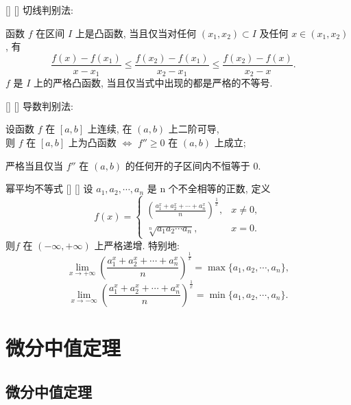 \documentclass[UTF8]{ctexart}
\begin{document}
			\begin{thm}
			    []
			    {}
			    []
			    []
				切线判别法: 

				函数  \( f \)  在区间  \( I \)  上是凸函数, 当且仅当对任何  \( (x_1, x_2) \subset I \)  及任何  \( x \in (x_1, x_2) \) , 有
				\[\frac{f(x) - f(x_1)}{x - x_1} \leq \frac{f(x_2) - f(x_1)}{x_2 - x_1} \leq \frac{f(x_2) - f(x)}{x_2 - x}. \quad\] 
				\( f \)  是  \( I \)  上的严格凸函数, 当且仅当式中出现的都是严格的不等号. 
			\end{thm}

			\begin{thm}
			    []
			    {}
			    []
			    []
			导数判别法: 

			设函数  \( f \)  在  \([a, b]\)  上连续, 在  \((a, b)\)  上二阶可导, \\
			则  \( f \)  在  \([a, b]\)  上为凸函数 \(\Longleftrightarrow\) \( f'' \geq 0 \)  在  \((a, b)\)  上成立; 

			严格当且仅当  \( f'' \) 在  \((a, b)\)  的任何开的子区间内不恒等于 0. 
			\end{thm}

			\begin{xmp}
			    []
			    {幂平均不等式}
			    []
			    []
				 设 \(a_1, a_2, \cdots, a_n\) 是 n 个不全相等的正数, 定义
                \[f(x) = 
                \begin{cases}
                \left( \frac{a_1^x + a_2^x + \cdots + a_n^x}{n} \right)^{\frac{1}{x}}, & x \neq 0, \\
                \sqrt[n]{a_1 a_2 \cdots a_n}, & x = 0.
                \end{cases}
                \]
                则\(f\) 在 \((-\infty, +\infty)\) 上严格递增.
                特别地: 
                \[
                \lim_{x \to +\infty} \left( \frac{a_1^x + a_2^x + \cdots + a_n^x}{n} \right)^{\frac{1}{x}} = \max\{a_1, a_2, \cdots, a_n\},
                \]
                \[
                \lim_{x \to -\infty} \left( \frac{a_1^x + a_2^x + \cdots + a_n^x}{n} \right)^{\frac{1}{x}} = \min\{a_1, a_2, \cdots, a_n\}.
                \]

			\end{xmp}
		
		
	\section{微分中值定理}
		
		\subsection{微分中值定理}
\end{document}
